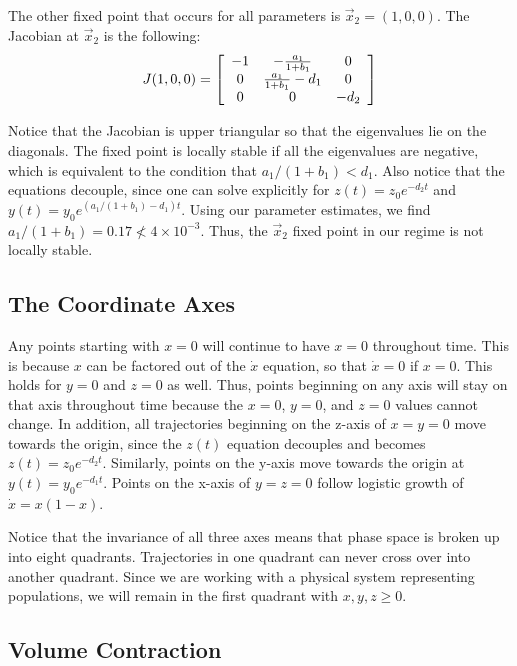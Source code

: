 \documentclass[12pt,journal,compsoc,twoside]{IEEEtran}
\begin{document}
The other fixed point that occurs for all parameters is $\vec{x}_2 = (1,0,0)$. The Jacobian at $\vec{x}_2$ is the following:
\begin{equation}
J(1,0,0) = \left[ \begin{array}{ c c c}
-1 & -\frac{a_1}{1 + b_1} & 0 \\
0 & \frac{a_1}{1 + b_1} - d_1 & 0 \\
0 & 0 & -d_2 
\end{array} \right]
\end{equation}

Notice that the Jacobian is upper triangular so that the eigenvalues lie on the diagonals. The fixed point is locally stable if all the eigenvalues are negative, which is equivalent to the condition that $a_1/(1 + b_1) < d_1$.  Also notice that the equations decouple, since one can solve explicitly for $z(t) = z_0 e^{-d_2 t}$ and $y(t) = y_0 e^{(a_1/(1 + b_1) - d_1) t}$. Using our parameter estimates, we find $a_1 / (1 + b_1) = 0.17 \not < 4 \times 10^{-3}$. Thus, the $\vec{x}_2$ fixed point in our regime is not locally stable. 

\subsection{The Coordinate Axes}

Any points starting with $x=0$ will continue to have $x=0$ throughout time. This is because $x$ can be factored out of the $\dot{x}$ equation, so that $\dot{x} = 0$ if $x = 0$. This holds for $y=0$ and $z=0$ as well. Thus, points beginning on any axis will stay on that axis throughout time because the $x=0$, $y=0$, and $z=0$ values cannot change. In addition, all trajectories beginning on the z-axis of $x=y=0$ move towards the origin, since the $z(t)$ equation decouples and becomes $z(t) = z_0 e^{-d_2 t}$. Similarly, points on the y-axis move towards the origin at $y(t) = y_0 e^{-d_1t}$. Points on the x-axis of $y=z=0$ follow logistic growth of $\dot{x} = x(1-x)$.  

Notice that the invariance of all three axes means that phase space is broken up into eight quadrants. Trajectories in one quadrant can never cross over into another quadrant. Since we are working with a physical system representing populations, we will remain in the first quadrant with $x, y, z \geq 0$. 

\subsection{Volume Contraction}
\end{document}
